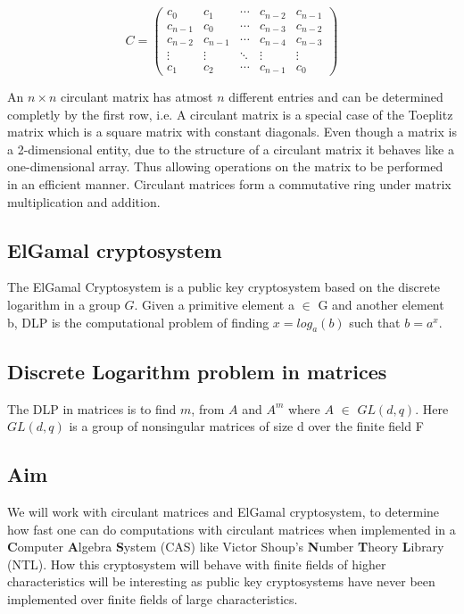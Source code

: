 \[ C =\left( \begin{array}{ccccc}
c_{0} & c_{1}   &  \cdots  &c_{n-2} & c_{n-1} \\
c_{n-1} & c_{0}  &  \cdots  &c_{n-3}    &c_{n-2} \\
c_{n-2} & c_{n-1}     &  \cdots  &c_{n-4}  &c_{n-3} \\
\vdots   &\vdots  & \ddots& \vdots   & \vdots \\
c_{1} & c_{2}   &  \cdots  &c_{n-1}   &c_{0}
\end{array} \right)\]

An $n \times n$ circulant matrix has atmost $n$ different entries and can be determined completly by the first row, i.e.
A circulant matrix is a special case of the Toeplitz matrix which is a square matrix with constant diagonals.
Even though a matrix is a 2-dimensional entity, due to the structure of a circulant matrix it behaves like a one-dimensional array. Thus
allowing operations on the matrix to be performed in an efficient manner.
Circulant matrices form a commutative ring under matrix multiplication and addition.

\subsection{ElGamal cryptosystem}
The ElGamal Cryptosystem is a public key cryptosystem based on the discrete logarithm in a group $ G $.
Given a primitive element a $ \in $ G and another element b, DLP is the computational problem of finding 
$x = log_{a} (b) $ such that $b = a^{x}$.

\subsection{Discrete Logarithm problem in matrices}
The DLP in matrices is to find $m$, from $A$ and $A^m$ where $A$ $\in$ $GL(d,q)$.
Here $GL(d,q)$ is a group of nonsingular matrices of size d over the finite field F

\subsection{Aim}

We will work with circulant matrices and ElGamal cryptosystem, to determine how fast one can do computations with circulant matrices
when implemented in a \textbf{C}omputer \textbf{A}lgebra \textbf{S}ystem (CAS) like Victor Shoup's 
\textbf{N}umber \textbf{T}heory \textbf{L}ibrary (NTL). 
How this cryptosystem will behave with finite fields of higher characteristics will be interesting as public key cryptosystems have never been 
implemented over finite fields of large characteristics.

